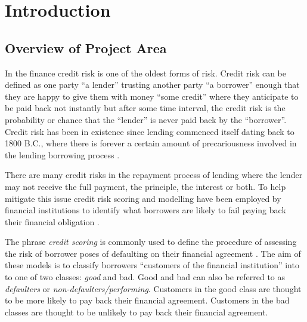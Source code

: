
\chapter{Introduction} %

\label{Chapter1} %


\section*{Overview of Project Area}

In the finance credit risk is one of the oldest forms of risk. Credit risk can be defined as one party ``a lender'' trusting another party ``a borrower'' enough that they are happy to give them with money ``some credit'' where they anticipate to be paid back not instantly but after some time interval, the credit risk is the probability or chance that the ``lender'' is never paid back by the ``borrower''. Credit risk has been in existence since lending commenced itself dating back to 1800 B.C., where there is forever a certain amount of precariousness involved in the lending borrowing process \citep{caouette_managing_1998}.


There are many credit risks in the repayment process of lending where the lender may not receive the full payment, the principle, the interest or both. To help mitigate this issue credit risk scoring and modelling have been employed by financial institutions to identify what borrowers are likely to fail paying back their financial obligation \citep{sirirattanaphonkun_default_2012}.

The phrase \textit{credit scoring} is commonly used to define the procedure of assessing the risk of borrower poses of defaulting on their financial agreement \citep{hand_statistical_1997}. The aim of these models is to classify borrowers ``customers of the financial institution'' into to one of two classes: \textit{good} and {bad}. Good and bad can also be referred to as \textit{defaulters} or \textit{non-defaulters/performing}. Customers in the good class are thought to be more likely to pay back their financial agreement. Customers in the bad classes are thought to be unlikely to pay back their financial agreement. 

